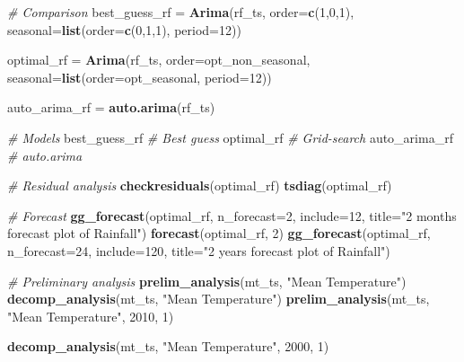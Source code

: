 \documentclass[
  11pt,
]{article}
\newenvironment{Shaded}{\begin{snugshade}}{\end{snugshade}}
\newcommand{\CommentTok}[1]{\textcolor[rgb]{0.56,0.35,0.01}{\textit{#1}}}
\newcommand{\DataTypeTok}[1]{\textcolor[rgb]{0.13,0.29,0.53}{#1}}
\newcommand{\DecValTok}[1]{\textcolor[rgb]{0.00,0.00,0.81}{#1}}
\newcommand{\KeywordTok}[1]{\textcolor[rgb]{0.13,0.29,0.53}{\textbf{#1}}}
\newcommand{\NormalTok}[1]{#1}
\newcommand{\StringTok}[1]{\textcolor[rgb]{0.31,0.60,0.02}{#1}}
\begin{document}
\begin{Shaded}
\begin{Highlighting}[]
{{{\CommentTok{# Comparison}
\NormalTok{best_guess_rf =}\StringTok{ }\KeywordTok{Arima}\NormalTok{(rf_ts,}
                   \DataTypeTok{order=}\KeywordTok{c}\NormalTok{(}\DecValTok{1}\NormalTok{,}\DecValTok{0}\NormalTok{,}\DecValTok{1}\NormalTok{),}
                   \DataTypeTok{seasonal=}\KeywordTok{list}\NormalTok{(}\DataTypeTok{order=}\KeywordTok{c}\NormalTok{(}\DecValTok{0}\NormalTok{,}\DecValTok{1}\NormalTok{,}\DecValTok{1}\NormalTok{), }\DataTypeTok{period=}\DecValTok{12}\NormalTok{))}

\NormalTok{optimal_rf =}\StringTok{ }\KeywordTok{Arima}\NormalTok{(rf_ts,}
                   \DataTypeTok{order=}\NormalTok{opt_non_seasonal,}
                   \DataTypeTok{seasonal=}\KeywordTok{list}\NormalTok{(}\DataTypeTok{order=}\NormalTok{opt_seasonal, }\DataTypeTok{period=}\DecValTok{12}\NormalTok{))}

\NormalTok{auto_arima_rf =}\StringTok{ }\KeywordTok{auto.arima}\NormalTok{(rf_ts)}

\CommentTok{# Models}
\NormalTok{best_guess_rf }\CommentTok{# Best guess}
\NormalTok{optimal_rf }\CommentTok{# Grid-search}
\NormalTok{auto_arima_rf }\CommentTok{# auto.arima}

\CommentTok{# Residual analysis}
\KeywordTok{checkresiduals}\NormalTok{(optimal_rf)}
\KeywordTok{tsdiag}\NormalTok{(optimal_rf)}

\CommentTok{# Forecast}
\KeywordTok{gg_forecast}\NormalTok{(optimal_rf, }\DataTypeTok{n_forecast=}\DecValTok{2}\NormalTok{, }\DataTypeTok{include=}\DecValTok{12}\NormalTok{, }\DataTypeTok{title=}\StringTok{"2 months forecast plot of Rainfall"}\NormalTok{)}
\KeywordTok{forecast}\NormalTok{(optimal_rf, }\DecValTok{2}\NormalTok{)}
\KeywordTok{gg_forecast}\NormalTok{(optimal_rf, }\DataTypeTok{n_forecast=}\DecValTok{24}\NormalTok{, }\DataTypeTok{include=}\DecValTok{120}\NormalTok{, }\DataTypeTok{title=}\StringTok{"2 years forecast plot of Rainfall"}\NormalTok{)}

\CommentTok{# Preliminary analysis}
\KeywordTok{prelim_analysis}\NormalTok{(mt_ts, }\StringTok{"Mean Temperature"}\NormalTok{)}
\KeywordTok{decomp_analysis}\NormalTok{(mt_ts, }\StringTok{"Mean Temperature"}\NormalTok{)}
\KeywordTok{prelim_analysis}\NormalTok{(mt_ts, }\StringTok{"Mean Temperature"}\NormalTok{, }\DecValTok{2010}\NormalTok{, }\DecValTok{1}\NormalTok{)}

\KeywordTok{decomp_analysis}\NormalTok{(mt_ts, }\StringTok{"Mean Temperature"}\NormalTok{, }\DecValTok{2000}\NormalTok{, }\DecValTok{1}\NormalTok{)}

}}}
\end{Highlighting}
\end{Shaded}
\end{document}
